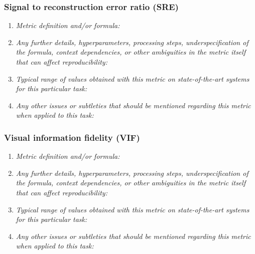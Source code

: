 \documentclass[a4paper,11pt]{article}
\begin{document}
        \subsubsection{Signal to reconstruction error ratio (SRE)}
            \begin{enumerate}[label=\alph*.]
                \item \textit{Metric definition and/or formula:}
                \bigskip
                \item \textit{Any further details, hyperparameters, processing steps, underspecification of the formula, context dependencies, or other ambiguities in the metric itself that can affect reproducibility:}
                \bigskip
                \item \textit{Typical range of values obtained with this metric on state-of-the-art systems for this particular task:}
                \bigskip
                \item \textit{Any other issues or subtleties that should be mentioned regarding this metric when applied to this task:}
                \bigskip
            \end{enumerate}
        \subsubsection{Visual information fidelity (VIF)}
            \begin{enumerate}[label=\alph*.]
                \item \textit{Metric definition and/or formula:}
                \bigskip
                \item \textit{Any further details, hyperparameters, processing steps, underspecification of the formula, context dependencies, or other ambiguities in the metric itself that can affect reproducibility:}
                \bigskip
                \item \textit{Typical range of values obtained with this metric on state-of-the-art systems for this particular task:}
                \bigskip
                \item \textit{Any other issues or subtleties that should be mentioned regarding this metric when applied to this task:}
                \bigskip
            \end{enumerate}
\end{document}
